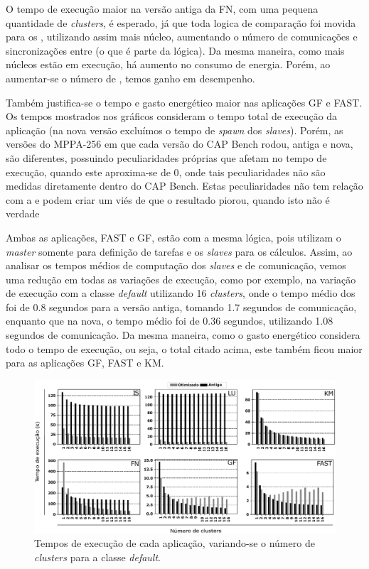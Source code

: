 \documentclass[a4paper,11pt]{article}
\newcommand{\mppa}{MPPA-256\xspace}
\newcommand{\capb}{CAP Bench\xspace}
\begin{document}
O tempo de execução maior na versão antiga da FN, com uma pequena quantidade de \textit{clusters}, é esperado, já que toda logica de comparação foi movida para os \ccs, utilizando assim mais núcleo, aumentando o número de comunicações e sincronizações entre \ccs (o que é parte da lógica). Da mesma maneira, como mais núcleos estão em execução, há aumento no consumo de energia. Porém, ao aumentar-se o número de \ccs, temos ganho em desempenho. 

Também justifica-se o tempo e gasto energético maior nas aplicações GF e FAST. Os tempos mostrados nos gráficos consideram o tempo total de execução da aplicação (na nova versão excluímos o tempo de \textit{spawn} dos \textit{slaves}). Porém, as versões do \mppa em que cada versão do \capb rodou, antiga e nova, são diferentes, possuindo peculiaridades próprias que afetam no tempo de execução, quando este aproxima-se de 0, onde tais peculiaridades não são medidas diretamente dentro do \capb. Estas peculiaridades não tem relação com a \async e podem criar um viés de que o resultado piorou, quando isto não é verdade

Ambas as aplicações, FAST e GF, estão com a mesma lógica, pois utilizam o \textit{master} somente para definição de tarefas e os \textit{slaves} para os cálculos. Assim, ao analisar os tempos médios de computação dos \textit{slaves} e de comunicação, vemos uma redução em todas as variações de execução, como por exemplo, na variação de execução com a classe \textit{default} utilizando 16 \textit{clusters}, onde o tempo médio dos \ccs foi de 0.8 segundos para a versão antiga, tomando 1.7 segundos de comunicação, enquanto que na nova, o tempo médio foi de 0.36 segundos, utilizando 1.08 segundos de comunicação. Da mesma maneira, como o gasto energético considera todo o tempo de execução, ou seja, o total citado acima, este também ficou maior para as aplicações GF, FAST e KM.

\begin{figure}[h]
\centering
\includegraphics[width=15cm, keepaspectratio]{figs/execution-time.pdf}
\caption{Tempos de execução de cada aplicação, variando-se o número de \textit{clusters} para a classe \textit{default}.}\par
\label{fig:executiontime}
\end{figure}
\end{document}
